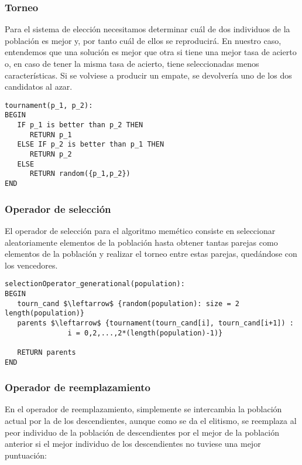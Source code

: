 \documentclass[11pt,leqno]{article}
\begin{document}
\subsubsection{Torneo}

Para el sistema de elección necesitamos determinar cuál de dos individuos de la población es mejor y, por tanto cuál de ellos se reproducirá. En nuestro caso, entendemos que una solución es mejor que otra si tiene una mejor tasa de acierto o, en caso de tener la misma tasa de acierto, tiene seleccionadas menos características. Si se volviese a producir un empate, se devolvería uno de los dos candidatos al azar.
	
\begin{lstlisting}[mathescape=true]
tournament(p_1, p_2):
BEGIN
   IF p_1 is better than p_2 THEN
      RETURN p_1
   ELSE IF p_2 is better than p_1 THEN
      RETURN p_2
   ELSE
      RETURN random({p_1,p_2})
END
\end{lstlisting}


\subsubsection{Operador de selección}

	El operador de selección para el algoritmo memético consiste en seleccionar aleatoriamente elementos de la población hasta obtener tantas parejas como elementos de la población y realizar el torneo entre estas parejas, quedándose con los vencedores.
	
\begin{lstlisting}[mathescape=true]
selectionOperator_generational(population):
BEGIN
   tourn_cand $\leftarrow$ {random(population): size = 2 length(population)}
   parents $\leftarrow$ {tournament(tourn_cand[i], tourn_cand[i+1]) : 
               i = 0,2,...,2*(length(population)-1)}
   
   RETURN parents
END
\end{lstlisting}

\subsubsection{Operador de reemplazamiento}

	En el operador de reemplazamiento, simplemente se intercambia la población actual por la de los descendientes, aunque como se da el elitismo, se reemplaza al peor individuo de la población de descendientes por el mejor de la población anterior si el mejor individuo de los descendientes no tuviese una mejor puntuación:
	
\end{document}
